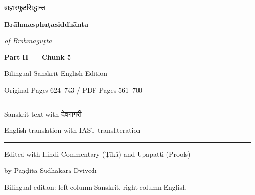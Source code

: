\documentclass[11pt,a4paper]{article}
\begin{document}
\begin{titlepage}
\begin{center}
\vspace*{2cm}

{\fontsize{14}{16}\selectfont\devanagarifont ब्राह्मस्फुटसिद्धान्त}

\vspace{0.8cm}

{\LARGE\bfseries\color{titlecolor} Brāhmasphuṭasiddhānta}

\vspace{0.5cm}

{\Large\itshape of Brahmagupta}

\vspace{1.5cm}

{\large\bfseries Part II --- Chunk 5}

\vspace{0.5cm}

{\large Bilingual Sanskrit-English Edition}

\vspace{0.3cm}

{\small Original Pages 624--743 / PDF Pages 561--700}

\vspace{2cm}

\rule{0.6\textwidth}{0.5pt}

\vspace{0.5cm}

{\normalsize Sanskrit text with \devanagarifont देवनागरी}

\vspace{0.2cm}

{\normalsize English translation with IAST transliteration}

\vspace{0.5cm}

\rule{0.6\textwidth}{0.5pt}

\vfill

{\small Edited with Hindi Commentary (Ṭīkā) and Upapatti (Proofs)}

{\small by Paṇḍita Sudhākara Dvivedī}

\vspace{1cm}

{\footnotesize Bilingual edition: left column Sanskrit, right column English}

\end{center}
\end{titlepage}
\end{document}
